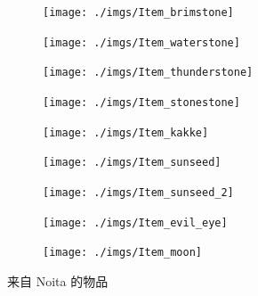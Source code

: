 \documentclass[11pt]{article}
\begin{document}
    \begin{figure}[ht]
        \centering
        \begin{subfigure}{3em}
            \centering
            \texttt{[image: ./imgs/Item\_brimstone]}
            \caption{}
            \label{fig:firestone}
        \end{subfigure}
        \begin{subfigure}{3em}
            \centering
            \texttt{[image: ./imgs/Item\_waterstone]}
            \caption{}
            \label{fig:waterstone}
        \end{subfigure}
        \begin{subfigure}{3em}
            \centering
            \texttt{[image: ./imgs/Item\_thunderstone]}
            \caption{}
            \label{fig:thunderstone}
        \end{subfigure}
        \begin{subfigure}{3em}
            \centering
            \texttt{[image: ./imgs/Item\_stonestone]}
            \caption{}
            \label{fig:stonestone}
        \end{subfigure}
        \begin{subfigure}{3em}
            \centering
            \texttt{[image: ./imgs/Item\_kakke]}
            \caption{}
            \label{fig:poopstone}
        \end{subfigure}
        \begin{subfigure}{3em}
            \centering
            \texttt{[image: ./imgs/Item\_sunseed]}
            \caption{}
            \label{fig:sunseed}
        \end{subfigure}
        \begin{subfigure}{3em}
            \centering
            \texttt{[image: ./imgs/Item\_sunseed\_2]}
            \caption{}
            \label{fig:sunstone}
        \end{subfigure}
        \begin{subfigure}{3em}
            \centering
            \texttt{[image: ./imgs/Item\_evil\_eye]}
            \caption{}
            \label{fig:evileye}
        \end{subfigure}
        \begin{subfigure}{3em}
            \centering
            \texttt{[image: ./imgs/Item\_moon]}
            \caption{}
            \label{fig:moon}
        \end{subfigure}
        \caption{来自 Noita 的物品}
    \end{figure}
\end{document}
